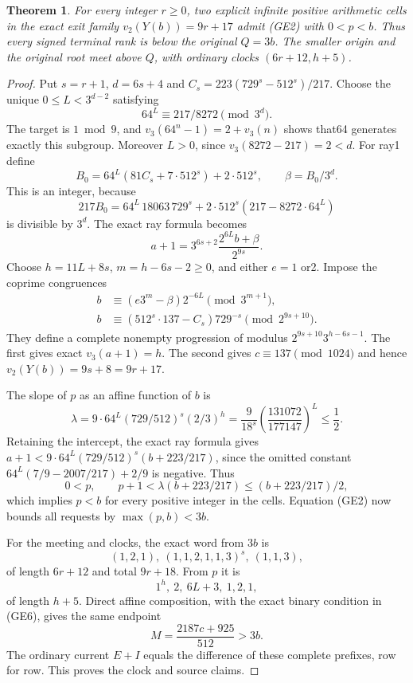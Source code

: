\documentclass[11pt]{article}
\newtheorem{theorem}{Theorem}
\begin{document}
\begin{theorem}\label{thm:nativegrowthescape}
For every integer $r\ge0$, two explicit infinite positive arithmetic
cells in the exact exit family $v_2(Y(b))=9r+17$ admit (GE2) with
$0<p<b$. Thus every signed terminal rank is below the original
$Q=3b$. The smaller origin and the original root meet above $Q$,
with ordinary clocks $(6r+12,h+5)$.
\end{theorem}
\begin{proof}
Put $s=r+1$, $d=6s+4$ and
$C_s=223(729^s-512^s)/217$. Choose the unique
$0\le L<3^{d-2}$ satisfying
\[
 64^L\equiv217/8272\pmod{3^d}.
 \tag{GE4}
\]
The target is $1\bmod9$, and
$v_3(64^n-1)=2+v_3(n)$ shows that64 generates exactly this
subgroup. Moreover $L>0$, since $v_3(8272-217)=2<d$.
For ray1 define
\[
 B_0=64^L(81C_s+7\cdot512^s)+2\cdot512^s,\qquad
 \beta=B_0/3^d.
\]
This is an integer, because
\[
 217B_0=64^L\,18063\,729^s+
           2\cdot512^s(217-8272\cdot64^L)
\]
is divisible by $3^d$. The exact ray formula becomes
\[
 a+1=3^{6s+2}\frac{2^{6L}b+\beta}{2^{9s}}.
 \tag{GE5}
\]
Choose $h=11L+8s$, $m=h-6s-2\ge0$, and either $e=1$ or2.
Impose the coprime congruences
\[
\begin{split}
 b&\equiv(e3^m-\beta)2^{-6L}\pmod{3^{m+1}},\\
 b&\equiv(512^s\cdot137-C_s)729^{-s}
                    \pmod{2^{9s+10}}.
\end{split}
 \tag{GE6}
\]
They define a complete nonempty progression of modulus
$2^{9s+10}3^{h-6s-1}$. The first gives exact $v_3(a+1)=h$.
The second gives $c\equiv137\pmod{1024}$ and hence
$v_2(Y(b))=9s+8=9r+17$.

The slope of $p$ as an affine function of $b$ is
\[
 \lambda=9\cdot64^L(729/512)^s(2/3)^h
 =\frac9{18^s}\left(\frac{131072}{177147}\right)^L
 \le\frac12.
\]
Retaining the intercept, the exact ray formula gives
$a+1<9\cdot64^L(729/512)^s(b+223/217)$, since the omitted
constant $64^L(7/9-2007/217)+2/9$ is negative.
Thus
\[
 0<p,\qquad p+1<\lambda(b+223/217)\le(b+223/217)/2,
\]
which implies $p<b$ for every positive integer in the cells.
Equation (GE2) now bounds all requests by $\max(p,b)<3b$.

For the meeting and clocks, the exact word from $3b$ is
\[
 (1,2,1),\ (1,1,2,1,1,3)^s,\ (1,1,3),
\]
of length $6r+12$ and total $9r+18$. From $p$ it is
\[
 1^h,\ 2,\ 6L+3,\ 1,2,1,
\]
of length $h+5$. Direct affine composition, with the exact
binary condition in (GE6), gives the same endpoint
\[
 M=\frac{2187c+925}{512}>3b.
 \tag{GE7}
\]
The ordinary current $E+I$ equals the difference of these complete
prefixes, row for row. This proves the clock and source claims.
\end{proof}
\end{document}
